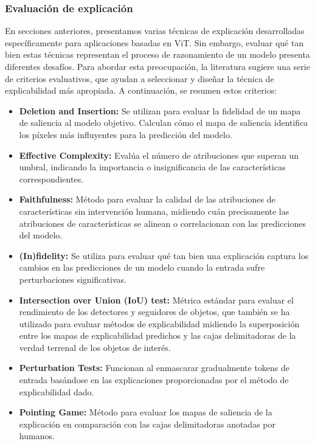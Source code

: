  \subsubsection{Evaluación de explicación}
 En secciones anteriores, presentamos varias técnicas de explicación desarrolladas específicamente para aplicaciones basadas en ViT. Sin embargo, evaluar qué tan bien estas técnicas representan el proceso de razonamiento de un modelo presenta diferentes desafíos. Para abordar esta preocupación, la literatura sugiere una serie de criterios evaluativos, que ayudan a seleccionar y diseñar la técnica de explicabilidad más apropiada. A continuación, se resumen estos criterios:
 \begin{itemize}
 	\item \textbf{Deletion and Insertion:} Se utilizan para evaluar la fidelidad de un mapa de saliencia al modelo objetivo. Calculan cómo el mapa de saliencia identifica los píxeles más influyentes para la predicción del modelo.
 	\item \textbf{Effective Complexity:} Evalúa el número de atribuciones que superan un umbral, indicando la importancia o insignificancia de las características correspondientes.
 	
 	\item \textbf{Faithfulness:} Método para evaluar la calidad de las atribuciones de características sin intervención humana, midiendo cuán precisamente las atribuciones de características se alinean o correlacionan con las predicciones del modelo.
 	
 	\item \textbf{(In)fidelity:} Se utiliza para evaluar qué tan bien una explicación captura los cambios en las predicciones de un modelo cuando la entrada sufre perturbaciones significativas.
 	
 	\item \textbf{Intersection over Union (IoU) test:} Métrica estándar para evaluar el rendimiento de los detectores y seguidores de objetos, que también se ha utilizado para evaluar métodos de explicabilidad midiendo la superposición entre los mapas de explicabilidad predichos y las cajas delimitadoras de la verdad terrenal de los objetos de interés.
 	
 	\item \textbf{Perturbation Tests:} Funcionan al enmascarar gradualmente tokens de entrada basándose en las explicaciones proporcionadas por el método de explicabilidad dado.
 	
 	\item \textbf{Pointing Game:} Método para evaluar los mapas de saliencia de la explicación en comparación con las cajas delimitadoras anotadas por humanos.
 	

\end{itemize}
